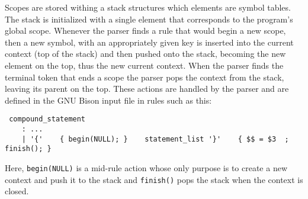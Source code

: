 Scopes are stored withing a stack structures which elements are symbol tables. The stack
is initialized with a single element that corresponds to the program's global scope.
Whenever the parser finds a rule that would begin a new scope, then a new symbol, with an
appropriately given key is inserted into the current context (top of the stack) and then
pushed onto the stack, becoming the new element on the top, thus the new current
context. When the parser finds the terminal token that ends a scope the parser pops
the context from the stack, leaving its parent on the top.
These actions are handled by the parser and are defined in the GNU Bison input file in
rules such as this:

\begin{lstlisting}
 compound_statement
	: ...
	| '{'    { begin(NULL); }    statement_list '}'    { $$ = $3  ; finish(); }
\end{lstlisting}

Here, \texttt{begin(NULL)} is a mid-rule action whose only purpose is to create a new context
and push it to the stack and \texttt{finish()} pops the stack when the context is closed.








